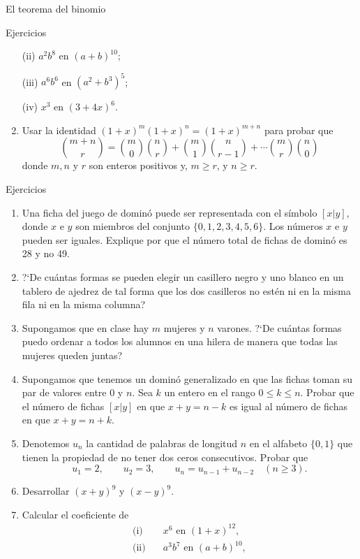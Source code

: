 \documentclass[11pt,spanish,makeidx]{amsbook}
\theoremstyle{definition}
\theoremstyle{remark}
\begin{document}
\begin{section}{El teorema del binomio}
\begin{subsection}{Ejercicios}
\begin{enumerate}
(ii) $a^2b^8 $ en $(a+b)^{10}$;

(iii) $a^6 b^6$ en $(a^2 +b^3)^5$;

(iv) $x^3$ en $(3+4x)^6$.

\item Usar la identidad $(1+x)^m(1+x)^n=(1+x)^{m+n}$ para probar que
$$
\binom{m+n}{r} =
\binom{m}{0}\binom{n}{r}+\binom{m}{1}\binom{n}{r-1}+\cdots
\binom{m}{r}\binom{n}{0}
$$
donde $m,n$ y $r$ son enteros positivos y, $m\ge r$, y $n \ge r$.
\end{enumerate}
\end{subsection}

\end{section}

\begin{section}{Ejercicios}

\begin{enumerate}
\item Una ficha del juego de dominó puede ser representada con el símbolo $[x|y]$, donde $x$ e $y$ son miembros del conjunto $\{0,1,2,3,4,5,6\}$. Los números $x$ e $y$ pueden ser iguales. Explique por que el número total de fichas de dominó es 28 y no 49.
\item ?`De cuántas formas se pueden elegir un casillero negro y uno blanco en un tablero de ajedrez de tal forma que los dos casilleros no estén ni en la misma fila ni en la misma columna?
\item Supongamos que en clase hay $m$ mujeres y $n$ varones. ?`De cuántas formas puedo ordenar a todos los alumnos en una hilera de manera que todas las mujeres queden juntas?
\item Supongamos que tenemos un dominó generalizado en que las fichas toman su par de valores entre $0$ y $n$. Sea $k$ un entero en el rango $0\le k \le n$. Probar que el número de fichas $[x|y]$ en que $x+y = n-k$ es igual al número de fichas en que  $x+y = n+k$.
\item Denotemos $u_n$ la cantidad de palabras de longitud $n$ en el alfabeto $\{0,1\}$ que tienen la propiedad de no tener dos ceros consecutivos. Probar que
$$
u_1=2,\qquad u_2=3,\qquad u_n =u_{n-1} +u_{n-2}\quad (n \ge 3).
$$
\item Desarrollar $(x+y)^9$ y $(x-y)^9$.
\item Calcular el coeficiente de
$$
\begin{aligned}
\text{(i)}\quad & x^6 \text{ en } (1+x)^{12},\\
\text{(ii)}\quad & a^3 b^7 \text{ en } (a+b)^{10},\\

\end{aligned}$$
\end{enumerate}
\end{section}
\end{document}
